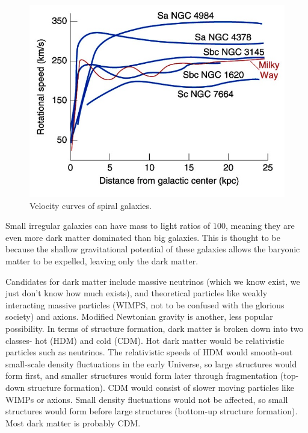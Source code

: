 \begin{figure}[!h]
\begin{center}
\includegraphics[width=\textwidth]{vcurve.jpg}
\end{center}
\caption{Velocity curves of spiral galaxies. \label{fig:vcurve}}
\end{figure}

Small irregular galaxies can have mass to light ratios of $100$, 
meaning they are even more dark matter dominated than big galaxies.  This is 
thought to be because the shallow gravitational potential of these galaxies 
allows the baryonic matter to be expelled, leaving only the dark matter.  

Candidates for dark matter include massive neutrinos (which we know exist, we 
just don't know how much exists), and theoretical particles like weakly 
interacting massive particles (WIMPS, not to be confused with the glorious 
society) and axions.  Modified Newtonian gravity is another, less popular 
possibility.  In terms of structure formation, dark matter is broken down into 
two classes- hot (HDM) and cold (CDM).  Hot dark matter would be relativistic 
particles such as neutrinos.  The relativistic speeds of HDM would smooth-out 
small-scale density fluctuations in the early Universe, so large structures 
would form first, and smaller structures would form later through fragmentation 
(top-down structure formation).  CDM would consist of slower moving 
particles like WIMPs or axions.  Small density fluctuations would not be 
affected, so small structures would form before large structures (bottom-up 
structure formation).  Most dark matter is probably CDM.  

